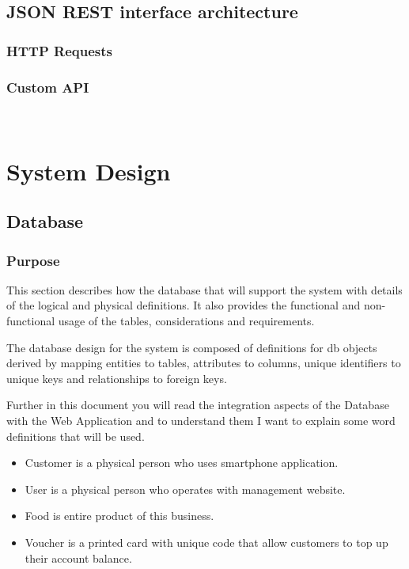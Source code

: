   \section{JSON REST interface architecture}	%
  \subsection{HTTP Requests}
  \subsection{Custom API}

  ~\cite{JSON_REST_interface}


\chapter{System Design}	%
  \section{Database}
    \subsection{Purpose}

This section describes how the database that will support the system with details of the logical and physical definitions. It also provides the functional and non-functional usage of the tables, considerations and requirements.

The database design for the system is composed of definitions for db objects derived by mapping entities to tables, attributes to columns, unique identifiers to unique keys and relationships to foreign keys. 

Further in this document you will read the integration aspects of the Database with the Web Application and to understand them I want to explain some word definitions that will be used.
\\
\begin{itemize}
\item Customer is a physical person who uses smartphone application.

\item User is a physical person who operates with management website.

\item Food is entire product of this business.

\item Voucher is a printed card with unique code that allow customers to top up their account balance.
\end{itemize}
